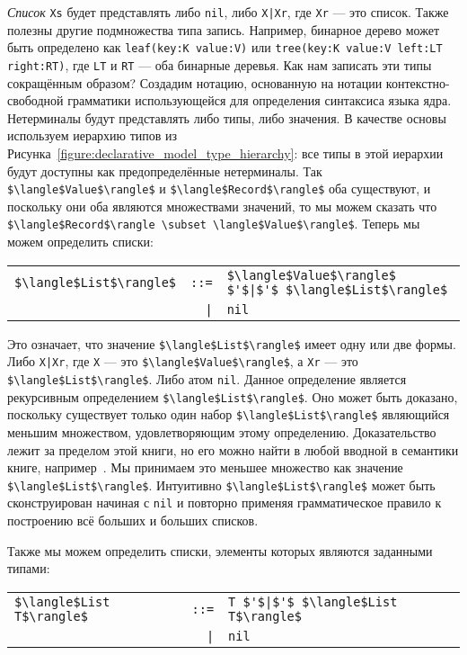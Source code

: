 \emph{Список} \lstinline!Xs! будет представлять либо \lstinline!nil!, либо \lstinline!X|Xr!, где \lstinline!Xr! --- это список. Также полезны другие подмножества типа запись. Например, бинарное дерево может быть определено как \lstinline!leaf(key:K value:V)! или \lstinline!tree(key:K value:V left:LT right:RT)!, где \lstinline!LT! и \lstinline!RT! --- оба бинарные деревья. Как нам записать эти типы сокращённым образом? Создадим нотацию, основанную на нотации контекстно-свободной грамматики использующейся для определения синтаксиса языка ядра. Нетерминалы будут представлять либо типы, либо значения. В качестве основы используем иерархию типов из Рисунка~\ref{figure:declarative_model_type_hierarchy}: все типы в этой иерархии будут доступны как предопределённые нетерминалы. Так \lstinline!$\langle$Value$\rangle$! и \lstinline!$\langle$Record$\rangle$! оба существуют, и поскольку они оба являются множествами значений, то мы можем сказать что \lstinline!$\langle$Record$\rangle \subset \langle$Value$\rangle$!. Теперь мы можем определить списки:

\begin{tabular}{lrl}
  \lstinline!$\langle$List$\rangle$! & \lstinline!::=! & \lstinline!$\langle$Value$\rangle$ $'$|$'$ $\langle$List$\rangle$! \\
  & \lstinline!|! & \lstinline!nil! 
\end{tabular}

Это означает, что значение \lstinline!$\langle$List$\rangle$! имеет одну или две формы. Либо \lstinline!X|Xr!, где \lstinline!X! --- это \lstinline!$\langle$Value$\rangle$!, а \lstinline!Xr! --- это \lstinline!$\langle$List$\rangle$!. Либо атом \lstinline!nil!. Данное определение является рекурсивным определением \lstinline!$\langle$List$\rangle$!. Оно может быть доказано, поскольку существует только один набор \lstinline!$\langle$List$\rangle$! являющийся меньшим множеством, удовлетворяющим этому определению. Доказательство лежит за пределом этой книги, но его можно найти в любой вводной в семантики книге, например~\cite{208}. Мы принимаем это меньшее множество как значение \lstinline!$\langle$List$\rangle$!. Интуитивно \lstinline!$\langle$List$\rangle$! может быть сконструирован начиная с \lstinline!nil! и повторно применяя грамматическое правило к построению всё больших и больших списков.

Также мы можем определить списки, элементы которых являются заданными типами:

\begin{tabular}{lrl}
  \lstinline!$\langle$List T$\rangle$! & \lstinline!::=! & \lstinline!T $'$|$'$ $\langle$List T$\rangle$! \\
  & \lstinline!|! & \lstinline!nil! \\
\end{tabular}

